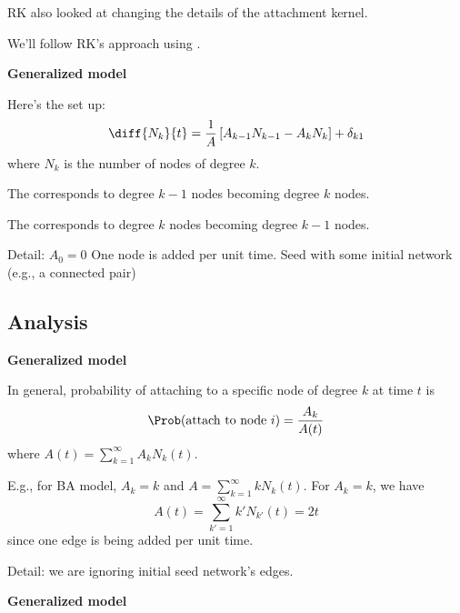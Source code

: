 \begin{frame}[label=]
\begin{frame}[label=]
\begin{frame}[label=]
\begin{frame}[label=]
\begin{frame}[label=]
\begin{frame}[label=]
\begin{frame}[label=]
\begin{frame}[label=]
\begin{frame}[label=]
\begin{frame}[label=]
\begin{frame}[label=]
\begin{frame}[label=]
\begin{frame}[label=]
\begin{frame}[label=]
\begin{frame}[label=]
\begin{frame}[label=]
\begin{frame}[label=]
\begin{frame}[label=]
\begin{frame}[label=]
\begin{frame}[label=]
\begin{frame}[label=]
\begin{frame}[label=]
      RK also looked at changing the details of
      the attachment kernel.
    
      We'll follow RK's approach using
      .
    
  


  \textbf{Generalized model}

  
  
      Here's the set up:
      $$
      \diff{N_k}{t}
      =
      \frac{1}{A}
      \left[
        A_{k-1} N_{k-1} - A_{k} N_{k}
      \right]
      + \delta_{k1}
      $$
      where $N_k$ is the number of nodes of degree $k$.
    
     
      The  corresponds to 
      degree $k-1$ nodes becoming degree $k$ nodes.
     
      The  corresponds to 
      degree $k$ nodes becoming degree $k-1$ nodes.
    
      Detail: $A_0=0$
     One node is added per unit time.
     Seed with some initial network\\
      {(e.g., a connected pair)}
    
  

\subsection{Analysis}

\begin{frame}[label=]
  \textbf{Generalized model}  
  
  
  
    In general, probability of attaching to a \alert{specific node}
    of degree $k$ at time $t$ is
    {
    $$
    \Prob(\mbox{attach to node $i$}) 
    = 
    \frac{A_k}{A(t)}
    $$
    }
    {
    where
    $ A(t) = \sum_{k=1}^{\infty} A_k N_k(t).$
    }
  
    E.g., for BA model, $A_k = k$ and $A = \sum_{k=1}^{\infty} k N_k(t)$.
   For $A_k=k$, we have
    $$
    {
    A(t) 
    = 
    \sum_{k'=1}^{\infty}
    k' N_{k'}(t)
    }
    {
    = 2t     
    }
    $$
    {
      since one edge is being added per unit time.
    }
  
      Detail: we are ignoring initial seed network's edges.
  



\begin{frame}[label=]
  \textbf{Generalized model}  

  
  

\end{frame}
\end{frame}
\end{frame}
\end{frame}
\end{frame}
\end{frame}
\end{frame}
\end{frame}
\end{frame}
\end{frame}
\end{frame}
\end{frame}
\end{frame}
\end{frame}
\end{frame}
\end{frame}
\end{frame}
\end{frame}
\end{frame}
\end{frame}
\end{frame}
\end{frame}
\end{frame}
\end{frame}
